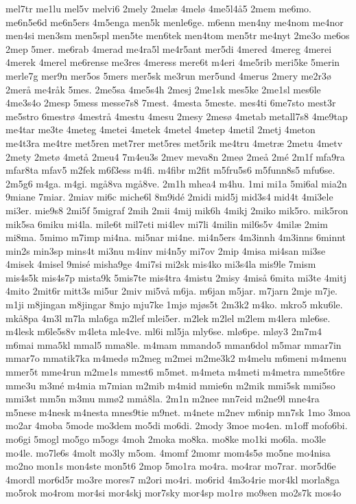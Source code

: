 {mel7tr
me1lu
mel5v
melvi6
2mely
2melæ
4melø
4me5l4å5
2mem
me6mo.
me6n5e6d
me6n5ers
4m5enga
men5k
menle6ge.
m6enn
men4ny
me4nom
me4nor
men4si
men3sm
men5spl
men5te
men6tek
men4tom
men5tr
me4nyt
2me3o
me6os
2mep
5mer.
me6rab
4merad
me4ra5l
me4r5ant
mer5di
4mered
4mereg
4merei
4merek
4merel
me6rense
me3res
4meress
mere6t
m4eri
4me5rib
meri5ke
5merin
merle7g
mer9n
mer5os
5mers
mer5sk
me3run
mer5und
4merus
2mery
me2r3ø
2merå
me4råk
5mes.
2me5sa
4me5s4h
2mesj
2me1sk
mes5ke
2me1sl
mes6le
4me3s4o
2mesp
5mess
messe7s8
7mest.
4mesta
5meste.
mes4ti
6me7sto
mest3r
me5stro
6mestrø
4mestrå
4mestu
4mesu
2mesy
2mesø
4metab
metall7s8
4me9tap
me4tar
me3te
4meteg
4metei
4metek
4metel
4metep
4metil
2metj
4meton
me4t3ra
me4tre
met5ren
met7rer
met5res
met5rik
me4tru
4metræ
2metu
4metv
2mety
2metø
4metå
2meu4
7m4eu3s
2mev
meva8n
2meø
2meå
2mé
2m1f
mfa9ra
mfar8ta
mfav5
m2fek
m6f3ess
m4fi.
m4fibr
m2fit
m5fru5s6
m5funn8s5
mfu6se.
2m5g6
m4ga.
m4gi.
mgå8va
mgå8ve.
2m1h
mhea4
m4hu.
1mi
mi1a
5mi6al
mia2n
9miane
7miar.
2miav
mi6c
miche6l
8m9idé
2midi
mid5j
mid3s4
mid4t
4mi3ele
mi3er.
mie9s8
2mi5f
5migraf
2mih
2mii
4mij
mik6h
4mikj
2miko
mik5ro.
mik5ron
mik5sa
6miku
mi4la.
mile6t
mil7eti
mi4lev
mi7li
4milin
mil6s5v
4milæ
2mim
mi8ma.
5mimo
m7imp
mi4na.
mi5nar
mi4ne.
mi4n5ers
4m3innh
4m3inns
6minnt
min2s
min3sp
mins4t
mi3nu
m4inv
mi4n5y
mi7ov
2mip
4misa
mi4san
mi3se
4misek
4misel
9misé
misha9ge
4mi7si
mi2sk
mis4ko
mi3s4la
mis9le
7mism
mis4s5k
mis4s7p
mista9k
5mis7te
mis4tra
4mistu
2misy
4miså
6mita
mi3te
4mitj
4mito
2mit6r
mitt3s
mi5ur
2miv
mi5vå
m6ja.
m6jan
m5jar.
m7jarn
2mje
m7je.
m1ji
m8jingan
m8jingar
8mjo
mju7ke
1mjø
mjøs5t
2m3k2
m4ko.
mkro5
mku6le.
mkå8pa
4m3l
m7la
mla6ga
m2lef
mlei5er.
m2lek
m2lel
m2lem
m4lera
mle6se.
m4lesk
m6le5s8v
m4leta
mle4ve.
ml6i
ml5ja
mly6se.
mlø6pe.
mløy3
2m7m4
m6mai
mma5kl
mmal5
mma8le.
m4mam
mmando5
mman6dol
m5mar
mmar7in
mmar7o
mmatik7ka
m4medø
m2meg
m2mei
m2me3k2
m4melu
m6meni
m4menu
mmer5t
mme4run
m2me1s
mmest6
m5met.
m4meta
m4meti
m4metra
mme5t6re
mme3u
m3mé
m4mia
m7mian
m2mib
m4mid
mmie6n
m2mik
mmi5sk
mmi5so
mmi3st
mm5n
m3mu
mmø2
mmå8la.
2m1n
m2nee
mn7eid
m2ne9l
mne4ra
m5nese
m4nesk
m4nesta
mnes9tie
m9net.
m4nete
m2nev
m6nip
mn7sk
1mo
3moa
mo2ar
4moba
5mode
mo3dem
mo5di
mo6di.
2mody
3moe
mo4en.
m1off
mofo6bi.
mo6gi
5mogl
mo5go
m5ogs
4moh
2moka
mo8ka.
mo8ke
mo1ki
mo6la.
mo3le
mo4le.
mo7le6s
4molt
mo3ly
m5om.
4momf
2momr
mom4s5ø
mo5ne
mo4nisa
mo2no
mon1s
mon4ste
mon5t6
2mop
5mo1ra
mo4ra.
mo4rar
mo7rar.
mor5d6e
4mordl
mor6d5r
mo3re
mores7
m2ori
mo4ri.
mo6rid
4m3o4rie
mor4kl
morla8ga
mo5rok
mo4rom
mor4si
mor4skj
mor7sky
mor4sp
mo1rø
mo9sen
mo2s7k
mos4o
}
